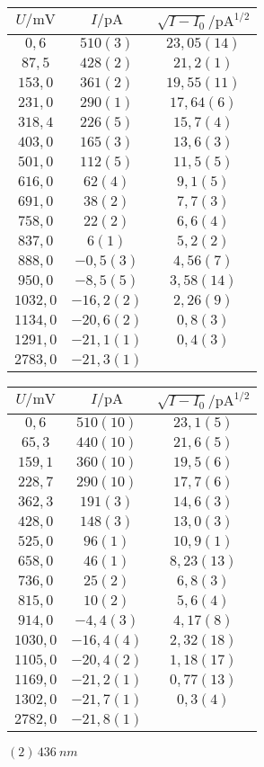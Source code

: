 \begin{figure}[htbp]
   \centering
\parbox{0.475\linewidth}{\centering
\begin{tabular}{c c c}
\hline$U / \unit{\milli\volt}$ & $I / \unit{\pico\ampere}$ & $\sqrt{I-I_0} / \unit{\pico\ampere\tothe{1/2}}$ \\ 
\hline
$0,6$ & $510(3)$ & $23,05(14)$ \\
$87,5$ & $428(2)$ & $21,2(1)$ \\
$153,0$ & $361(2)$ & $19,55(11)$ \\
$231,0$ & $290(1)$ & $17,64(6)$ \\
$318,4$ & $226(5)$ & $15,7(4)$ \\
$403,0$ & $165(3)$ & $13,6(3)$ \\
$501,0$ & $112(5)$ & $11,5(5)$ \\
$616,0$ & $62(4)$ & $9,1(5)$ \\
$691,0$ & $38(2)$ & $7,7(3)$ \\
$758,0$ & $22(2)$ & $6,6(4)$ \\
$837,0$ & $6(1)$ & $5,2(2)$ \\
$888,0$ & $-0,5(3)$ & $4,56(7)$ \\
$950,0$ & $-8,5(5)$ & $3,58(14)$ \\
$1032,0$ & $-16,2(2)$ & $2,26(9)$ \\
$1134,0$ & $-20,6(2)$ & $0,8(3)$ \\
$1291,0$ & $-21,1(1)$ & $0,4(3)$ \\
$2783,0$ & $-21,3(1)$ &    \\
\hline\end{tabular}
\caption{$(1)\,\SI{436}{nm}$}
}\quad\parbox{0.475\linewidth}{\centering
\begin{tabular}{c c c}
\hline$U / \unit{\milli\volt}$ & $I / \unit{\pico\ampere}$ & $\sqrt{I-I_0} / \unit{\pico\ampere\tothe{1/2}}$ \\ 
\hline
$0,6$ & $510(10)$ & $23,1(5)$ \\
$65,3$ & $440(10)$ & $21,6(5)$ \\
$159,1$ & $360(10)$ & $19,5(6)$ \\
$228,7$ & $290(10)$ & $17,7(6)$ \\
$362,3$ & $191(3)$ & $14,6(3)$ \\
$428,0$ & $148(3)$ & $13,0(3)$ \\
$525,0$ & $96(1)$ & $10,9(1)$ \\
$658,0$ & $46(1)$ & $8,23(13)$ \\
$736,0$ & $25(2)$ & $6,8(3)$ \\
$815,0$ & $10(2)$ & $5,6(4)$ \\
$914,0$ & $-4,4(3)$ & $4,17(8)$ \\
$1030,0$ & $-16,4(4)$ & $2,32(18)$ \\
$1105,0$ & $-20,4(2)$ & $1,18(17)$ \\
$1169,0$ & $-21,2(1)$ & $0,77(13)$ \\
$1302,0$ & $-21,7(1)$ & $0,3(4)$ \\
$2782,0$ & $-21,8(1)$ &    \\
\hline\end{tabular}
\caption{$(2)\,\SI{436}{nm}$}
}\end{figure}